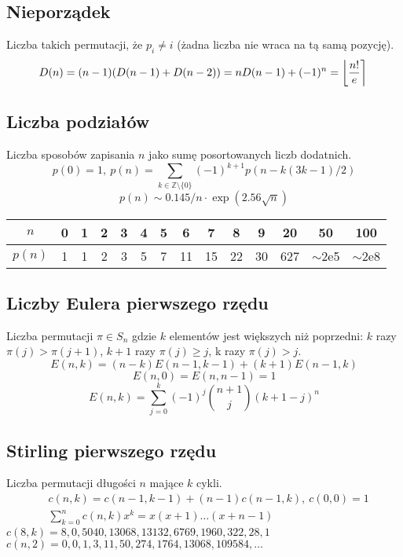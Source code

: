 	\subsection{Nieporządek}
		Liczba takich permutacji, że $p_i \neq i$ (żadna liczba nie wraca na tą samą pozycję).
		\[ \mkern-2mu D(n) = (n-1)(D(n-1)+D(n-2)) = n D(n-1)+(-1)^n = \left\lfloor\frac{n!}{e}\right\rceil \]

	\subsection{Liczba podziałów}
		Liczba sposobów zapisania $n$ jako sumę posortowanych liczb dodatnich.
		\[ p(0) = 1,\ p(n) = \sum_{k \in \mathbb Z \setminus \{0\}}{(-1)^{k+1} p(n - k(3k-1) / 2)} \]
		\[ p(n) \sim 0.145 / n \cdot \exp(2.56 \sqrt{n}) \]

		\begin{center}
		\begin{tabular}{c|c@{\ }c@{\ }c@{\ }c@{\ }c@{\ }c@{\ }c@{\ }c@{\ }c@{\ }c@{\ }c@{\ }c@{\ }c}
			$n$    & 0 & 1 & 2 & 3 & 4 & 5 & 6  & 7  & 8  & 9  & 20  & 50  & 100 \\ \hline
			$p(n)$ & 1 & 1 & 2 & 3 & 5 & 7 & 11 & 15 & 22 & 30 & 627 & $\mathtt{\sim}$2e5 & $\mathtt{\sim}$2e8 \\
		\end{tabular}
		\end{center}

	\subsection{Liczby Eulera pierwszego rzędu}
		Liczba permutacji $\pi \in S_n$ gdzie $k$ elementów jest większych niż poprzedni: $k$ razy $\pi(j)>\pi(j+1)$, $k+1$ razy $\pi(j)\geq j$, k razy $\pi(j)>j$.
		$$E(n,k) = (n-k)E(n-1,k-1) + (k+1)E(n-1,k)$$
		$$E(n,0) = E(n,n-1) = 1$$
		$$E(n,k) = \sum_{j=0}^k(-1)^j\binom{n+1}{j}(k+1-j)^n$$

	\subsection{Stirling pierwszego rzędu}
		Liczba permutacji długości $n$ mające $k$ cykli.
		\begin{align*}
			&c(n,k) = c(n-1,k-1) + (n-1) c(n-1,k),\ c(0,0) = 1 \\
			&\textstyle \sum_{k=0}^n c(n,k)x^k = x(x+1) \dots (x+n-1)
		\end{align*}
		$c(8,k) = 8, 0, 5040, 13068, 13132, 6769, 1960, 322, 28, 1$ \\
		$c(n,2) = 0, 0, 1, 3, 11, 50, 274, 1764, 13068, 109584, \dots$

